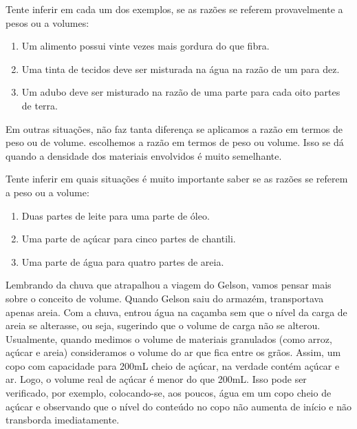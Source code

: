 \begin{knowledge}{}
Tente inferir em cada um dos exemplos, se as razões se referem provavelmente a pesos ou a volumes:
\begin{enumerate}
\item {} 
Um alimento possui vinte vezes mais gordura do que fibra.

\item {} 
Uma tinta de tecidos deve ser misturada na água na razão de um para dez.

\item {} 
Um adubo deve ser misturado na razão de uma parte para cada oito partes de terra.

\end{enumerate}

Em outras situações, não faz tanta diferença se aplicamos a razão em termos de peso ou de volume. escolhemos a razão em termos de peso ou volume. Isso se dá quando a densidade dos materiais envolvidos é muito semelhante.

Tente inferir em quais situações é muito importante saber se as razões se referem a peso ou a volume:
\begin{enumerate}
\item {} 
Duas partes de leite para uma parte de óleo.

\item {} 
Uma parte de açúcar para cinco partes de chantili.

\item {} 
Uma parte de água para quatro partes de areia.

\end{enumerate}
\end{knowledge}

\begin{knowledge}{}

Lembrando da chuva que atrapalhou a viagem do Gelson, vamos pensar mais sobre o conceito de volume. Quando Gelson saiu do armazém, transportava apenas areia. Com a chuva, entrou água na caçamba sem que o nível da carga de areia se alterasse, ou seja, sugerindo que o volume de carga não se alterou.
Usualmente, quando medimos o volume de materiais granulados (como arroz, açúcar e areia) consideramos o volume do ar que fica entre os grãos. Assim, um copo com capacidade para 200mL cheio de açúcar, na verdade contém açúcar e ar. Logo, o volume real de açúcar é menor do que 200mL. Isso pode ser verificado, por exemplo, colocando-se, aos poucos, água em um copo cheio de açúcar e observando que o nível do conteúdo no copo não aumenta de início e não transborda imediatamente.
\end{knowledge}

